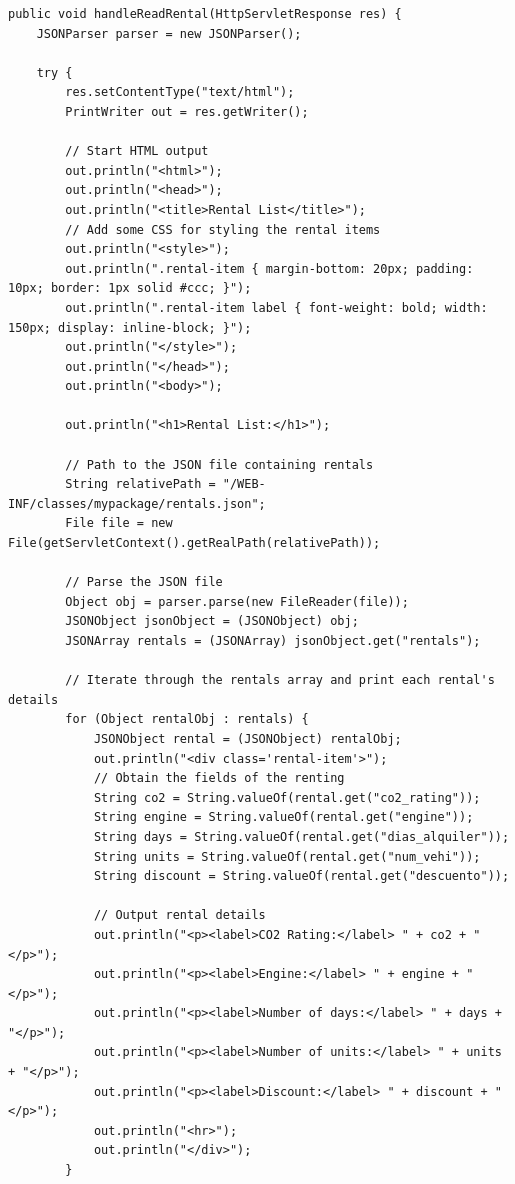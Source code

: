 \documentclass[12pt,a4paper]{article}
\begin{document}
\begin{lstlisting}[style=javastyle,caption=Funció handleReadRental per mostrar lloguers]
public void handleReadRental(HttpServletResponse res) {
    JSONParser parser = new JSONParser();
    
    try {    
        res.setContentType("text/html");
        PrintWriter out = res.getWriter();
        
        // Start HTML output
        out.println("<html>");
        out.println("<head>");
        out.println("<title>Rental List</title>");
        // Add some CSS for styling the rental items
        out.println("<style>");
        out.println(".rental-item { margin-bottom: 20px; padding: 10px; border: 1px solid #ccc; }");
        out.println(".rental-item label { font-weight: bold; width: 150px; display: inline-block; }");
        out.println("</style>");
        out.println("</head>");
        out.println("<body>");
        
        out.println("<h1>Rental List:</h1>");
        
        // Path to the JSON file containing rentals
        String relativePath = "/WEB-INF/classes/mypackage/rentals.json";
        File file = new File(getServletContext().getRealPath(relativePath));
        
        // Parse the JSON file
        Object obj = parser.parse(new FileReader(file));
        JSONObject jsonObject = (JSONObject) obj;
        JSONArray rentals = (JSONArray) jsonObject.get("rentals");
        
        // Iterate through the rentals array and print each rental's details
        for (Object rentalObj : rentals) {
            JSONObject rental = (JSONObject) rentalObj;
            out.println("<div class='rental-item'>");
            // Obtain the fields of the renting 
            String co2 = String.valueOf(rental.get("co2_rating"));
            String engine = String.valueOf(rental.get("engine"));
            String days = String.valueOf(rental.get("dias_alquiler"));
            String units = String.valueOf(rental.get("num_vehi"));
            String discount = String.valueOf(rental.get("descuento"));

            // Output rental details
            out.println("<p><label>CO2 Rating:</label> " + co2 + "</p>");
            out.println("<p><label>Engine:</label> " + engine + "</p>");
            out.println("<p><label>Number of days:</label> " + days + "</p>");
            out.println("<p><label>Number of units:</label> " + units + "</p>");
            out.println("<p><label>Discount:</label> " + discount + "</p>");
            out.println("<hr>");
            out.println("</div>");
        }
        

\end{lstlisting}
\end{document}

